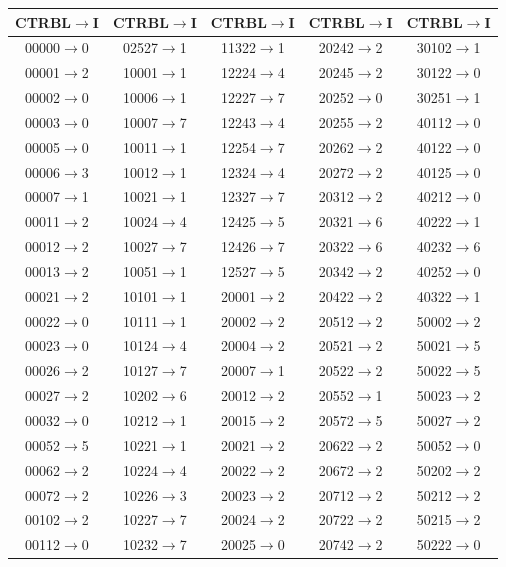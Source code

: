 \documentclass{article}
\begin{document}
\begin{table}
  \begin{longtable}{| c | c | c | c | c |}
    \hline
    CTRBL$\to$I & CTRBL$\to$I & CTRBL$\to$I & CTRBL$\to$I & CTRBL$\to$I\\
    \hline
    00000$\to$0 & 02527$\to$1 & 11322$\to$1 & 20242$\to$2 & 30102$\to$1\\
    00001$\to$2 & 10001$\to$1 & 12224$\to$4 & 20245$\to$2 & 30122$\to$0\\
    00002$\to$0 & 10006$\to$1 & 12227$\to$7 & 20252$\to$0 & 30251$\to$1\\
    00003$\to$0 & 10007$\to$7 & 12243$\to$4 & 20255$\to$2 & 40112$\to$0\\
    00005$\to$0 & 10011$\to$1 & 12254$\to$7 & 20262$\to$2 & 40122$\to$0\\
    00006$\to$3 & 10012$\to$1 & 12324$\to$4 & 20272$\to$2 & 40125$\to$0\\
    00007$\to$1 & 10021$\to$1 & 12327$\to$7 & 20312$\to$2 & 40212$\to$0\\
    00011$\to$2 & 10024$\to$4 & 12425$\to$5 & 20321$\to$6 & 40222$\to$1\\
    00012$\to$2 & 10027$\to$7 & 12426$\to$7 & 20322$\to$6 & 40232$\to$6\\
    00013$\to$2 & 10051$\to$1 & 12527$\to$5 & 20342$\to$2 & 40252$\to$0\\
    00021$\to$2 & 10101$\to$1 & 20001$\to$2 & 20422$\to$2 & 40322$\to$1\\
    00022$\to$0 & 10111$\to$1 & 20002$\to$2 & 20512$\to$2 & 50002$\to$2\\
    00023$\to$0 & 10124$\to$4 & 20004$\to$2 & 20521$\to$2 & 50021$\to$5\\
    00026$\to$2 & 10127$\to$7 & 20007$\to$1 & 20522$\to$2 & 50022$\to$5\\
    00027$\to$2 & 10202$\to$6 & 20012$\to$2 & 20552$\to$1 & 50023$\to$2\\
    00032$\to$0 & 10212$\to$1 & 20015$\to$2 & 20572$\to$5 & 50027$\to$2\\
    00052$\to$5 & 10221$\to$1 & 20021$\to$2 & 20622$\to$2 & 50052$\to$0\\
    00062$\to$2 & 10224$\to$4 & 20022$\to$2 & 20672$\to$2 & 50202$\to$2\\
    00072$\to$2 & 10226$\to$3 & 20023$\to$2 & 20712$\to$2 & 50212$\to$2\\
    00102$\to$2 & 10227$\to$7 & 20024$\to$2 & 20722$\to$2 & 50215$\to$2\\
    00112$\to$0 & 10232$\to$7 & 20025$\to$0 & 20742$\to$2 & 50222$\to$0\\

\end{longtable}
\end{table}
\end{document}
